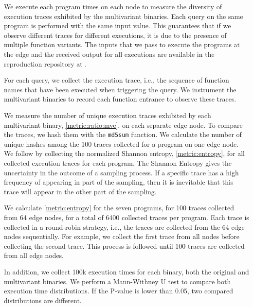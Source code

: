 We execute each program  times on each node to measure the diversity of execution traces exhibited by the multivariant binaries. Each query on the same program is performed with the same input value. This guarantees that if we observe different traces for different executions, it is due to the presence of multiple function variants. 
The inputs that we pass to execute the programs at the edge and the received output for all executions are available in the reproduction repository at . 

For each query, we collect the execution trace, i.e.,  the sequence of function names that have been executed when triggering the query.
We instrument the multivariant binaries to record each function entrance to observe these traces.


We measure the number of unique execution traces exhibited by each multivariant binary, \autoref{metric:ratio:mve}, on each separate edge node. To compare the traces, we hash them with the \texttt{md5sum} function.
We calculate the number of unique hashes among the 100 traces collected for a program on one edge node.
We follow by collecting the normalized Shannon entropy, \autoref{metric:entropy}, for all collected execution traces for each program.
The Shannon Entropy gives the uncertainty in the outcome of a sampling process.
If a specific trace has a high frequency of appearing in part of the sampling, then it is inevitable that this trace will appear in the other part of the sampling.


We calculate \autoref{metric:entropy} for the seven programs, for 100 traces collected from 64 edge nodes, for a total of 6400 collected traces per program.
Each trace is collected in a round-robin strategy, i.e., the traces are collected from the 64 edge nodes sequentially.
For example, we collect the first trace from all nodes before collecting the second trace.
This process is followed until 100 traces are collected from all edge nodes.


In addition, we collect 100k execution times for each binary, both the original and multivariant binaries.
We perform a Mann-Withney U test \cite{mann1947} to compare both execution time distributions. 
If the P-value is lower than 0.05, two compared distributions are different.

